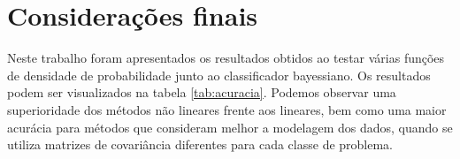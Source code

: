\documentclass[ 
	article,			%
	11pt,				%
	oneside,			%
	a4paper,			%
	english,			%
	brazil,				%
	]{abntex2}
\begin{document}
% 
% 
% 
% 
% 


% 


\section*{Considerações finais}




Neste trabalho foram apresentados os resultados obtidos ao testar várias funções
de densidade de probabilidade junto ao classificador bayessiano. Os resultados
podem ser visualizados na tabela \ref{tab:acuracia}. Podemos observar uma
superioridade dos métodos não lineares frente aos lineares, bem como uma maior
acurácia para métodos que consideram melhor a modelagem dos dados, quando se
utiliza matrizes de covariância diferentes para cada classe de problema.
\end{document}
